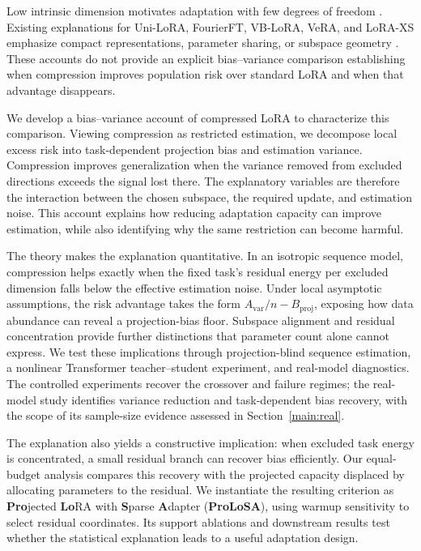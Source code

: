 Low intrinsic dimension motivates adaptation with few degrees of freedom \citep{aghajanyan2021intrinsic}. Existing explanations for Uni-LoRA, FourierFT, VB-LoRA, VeRA, and LoRA-XS emphasize compact representations, parameter sharing, or subspace geometry \citep{li2025unilora,gao2024fourierft,li2024vb,kopiczko2024vera,balazy2025lora}. These accounts do not provide an explicit bias--variance comparison establishing when compression improves population risk over standard LoRA and when that advantage disappears.

We develop a bias--variance account of compressed LoRA to characterize this comparison. Viewing compression as restricted estimation, we decompose local excess risk into task-dependent projection bias and estimation variance. Compression improves generalization when the variance removed from excluded directions exceeds the signal lost there. The explanatory variables are therefore the interaction between the chosen subspace, the required update, and estimation noise. This account explains how reducing adaptation capacity can improve estimation, while also identifying why the same restriction can become harmful.

The theory makes the explanation quantitative. In an isotropic sequence model, compression helps exactly when the fixed task's residual energy per excluded dimension falls below the effective estimation noise. Under local asymptotic assumptions, the risk advantage takes the form $A_{\mathrm{var}}/n-B_{\mathrm{proj}}$, exposing how data abundance can reveal a projection-bias floor. Subspace alignment and residual concentration provide further distinctions that parameter count alone cannot express. We test these implications through projection-blind sequence estimation, a nonlinear Transformer teacher--student experiment, and real-model diagnostics. The controlled experiments recover the crossover and failure regimes; the real-model study identifies variance reduction and task-dependent bias recovery, with the scope of its sample-size evidence assessed in Section~\ref{main:real}.

The explanation also yields a constructive implication: when excluded task energy is concentrated, a small residual branch can recover bias efficiently. Our equal-budget analysis compares this recovery with the projected capacity displaced by allocating parameters to the residual. We instantiate the resulting criterion as \textbf{Pro}jected \textbf{Lo}RA with \textbf{S}parse \textbf{A}dapter (\textbf{ProLoSA}), using warmup sensitivity to select residual coordinates. Its support ablations and downstream results test whether the statistical explanation leads to a useful adaptation design.

